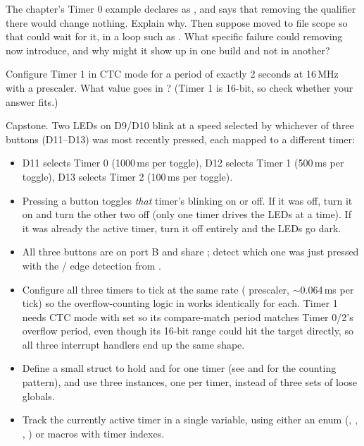 \label{c5:ex:5}
The chapter's Timer 0 example declares  as , and 
says that removing the qualifier there would change nothing. Explain why. Then
suppose  moved to file scope so that  could wait for it, in a loop
such as . What specific failure could removing 
now introduce, and why might it show up in one build and not in another?

\label{c5:ex:6}
Configure Timer 1 in CTC mode for a period of exactly 2 seconds at 16\,MHz with a 
prescaler. What value goes in ? (Timer 1 is 16-bit, so check whether your answer
fits.)

\label{c5:ex:7}
Capstone. Two LEDs on D9/D10 blink at a speed selected by whichever of three buttons (D11--D13)
was most recently pressed, each mapped to a different timer:
\begin{itemize}
  \item D11 selects Timer 0 (1000\,ms per toggle), D12 selects Timer 1 (500\,ms per toggle), D13
    selects Timer 2 (100\,ms per toggle).
  \item Pressing a button toggles \emph{that} timer's blinking on or off. If it was off, turn it on
    and turn the other two off (only one timer drives the LEDs at a time). If it was already the
    active timer, turn it off entirely and the LEDs go dark.
  \item All three buttons are on port B and share ; detect which one was just
    pressed with the / edge detection from .
  \item Configure all three timers to tick at the same rate ( prescaler,
    $\sim$0.064\,ms per tick) so the overflow-counting logic in  works identically
    for each. Timer 1 needs CTC mode with  set so its compare-match period matches
    Timer 0/2's overflow period, even though its 16-bit range could hit the target directly, so all
    three interrupt handlers end up the same shape.
  \item Define a small struct to hold  and  for
    one timer (see  and  for the counting pattern), and use three
    instances, one per timer, instead of three sets of loose globals.
  \item Track the currently active timer in a single variable, using either an enum
    (, , , ) or macros with timer
    indexes.
\end{itemize}

